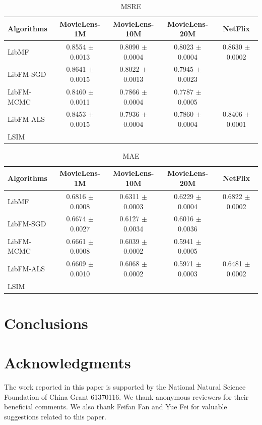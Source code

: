 \documentclass{sig-alternate-05-2015}
\begin{document}
\begin{table}[htpb]
	\centering
	\caption{MSRE}
	\label{tab:msre}
	\begin{tabular}{|l|c|c|c|c|}
		\hline
		\textbf{Algorithms} & \textbf{MovieLens-1M} & \textbf{MovieLens-10M} & \textbf{MovieLens-20M}  & \textbf{NetFlix} \\
		\hline
		LibMF      & 0.8554 $\pm$ 0.0013 & 0.8090 $\pm$ 0.0004 & 0.8023 $\pm$ 0.0004 & 0.8630 $\pm$ 0.0002 \\
		LibFM-SGD  & 0.8641 $\pm$ 0.0015 & 0.8022 $\pm$ 0.0013 & 0.7945 $\pm$ 0.0023 & \\
		LibFM-MCMC & 0.8460 $\pm$ 0.0011 & 0.7866 $\pm$ 0.0004 & 0.7787 $\pm$ 0.0005 & \\
		LibFM-ALS  & 0.8453 $\pm$ 0.0015 & 0.7936 $\pm$ 0.0004 & 0.7860 $\pm$ 0.0004 & 0.8406 $\pm$ 0.0001 \\
		LSIM       &  &  &  & \\
		\hline
	\end{tabular}
\end{table}

\begin{table}[htpb]
	\centering
	\caption{MAE}
	\label{tab:msre}
	\begin{tabular}{|l|c|c|c|c|}
		\hline
		\textbf{Algorithms} & \textbf{MovieLens-1M} & \textbf{MovieLens-10M} & \textbf{MovieLens-20M}  & \textbf{NetFlix} \\
		\hline
		LibMF      & 0.6816 $\pm$ 0.0008 & 0.6311 $\pm$ 0.0003 & 0.6229 $\pm$ 0.0004 & 0.6822 $\pm$ 0.0002 \\
		LibFM-SGD  & 0.6674 $\pm$ 0.0027 & 0.6127 $\pm$ 0.0034 & 0.6016 $\pm$ 0.0036 & \\
		LibFM-MCMC & 0.6661 $\pm$ 0.0008 & 0.6039 $\pm$ 0.0002 & 0.5941 $\pm$ 0.0005 & \\
		LibFM-ALS  & 0.6609 $\pm$ 0.0010 & 0.6068 $\pm$ 0.0002 & 0.5971 $\pm$ 0.0003 & 0.6481 $\pm$ 0.0002 \\
		LSIM       &  &  &  & \\
		\hline
	\end{tabular}
\end{table}


\section{Conclusions}


\section{Acknowledgments}
The work reported in this paper is supported by the National Natural Science Foundation of China Grant 61370116.
We thank anonymous reviewers for their beneficial comments.
We also thank Feifan Fan and Yue Fei for valuable suggestions related to this paper.



\end{document}

